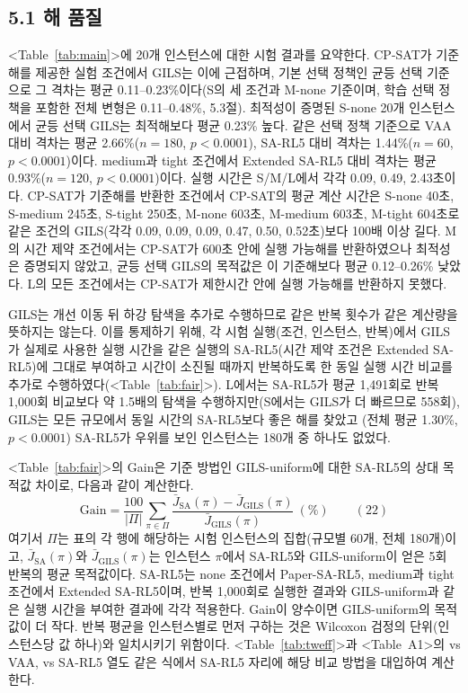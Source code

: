 \documentclass[10pt,a4paper]{article}
\begin{document}
\subsection{5.1 해 품질}
<Table~\ref{tab:main}>에 20개 인스턴스에 대한 시험 결과를 요약한다. CP-SAT가 기준해를 제공한
실험 조건에서 GILS는 이에 근접하며, 기본 선택 정책인 균등 선택 기준으로 그 격차는
평균 0.11--0.23\%이다(S의 세 조건과 M-none 기준이며, 학습 선택 정책을 포함한 전체 변형은 0.11--0.48\%, 5.3절). 최적성이 증명된 S-none 20개 인스턴스에서 균등 선택 GILS는 최적해보다 평균 0.23\% 높다. 같은 선택 정책 기준으로 VAA 대비
격차는 평균 2.66\%($n=180$, $p<0.0001$), SA-RL5 대비 격차는 1.44\%($n=60$, $p<0.0001$)이다.
medium과 tight 조건에서 Extended SA-RL5 대비 격차는 평균 0.93\%($n=120$, $p<0.0001$)이다. 실행 시간은 S/M/L에서 각각 0.09, 0.49, 2.43초이다.
CP-SAT가 기준해를 반환한 조건에서 CP-SAT의 평균 계산 시간은 S-none 40초, S-medium 245초, S-tight 250초, M-none 603초, M-medium 603초, M-tight 604초로 같은 조건의 GILS(각각 0.09, 0.09, 0.09, 0.47, 0.50, 0.52초)보다
100배 이상 길다. M의 시간 제약 조건에서는 CP-SAT가 600초 안에 실행 가능해를 반환하였으나 최적성은 증명되지 않았고, 균등 선택 GILS의 목적값은 이 기준해보다 평균 0.12--0.26\% 낮았다. L의 모든 조건에서는 CP-SAT가 제한시간 안에 실행 가능해를 반환하지 못했다.

GILS는 개선 이동 뒤 하강 탐색을 추가로 수행하므로 같은 반복 횟수가 같은 계산량을 뜻하지는 않는다. 이를 통제하기
위해, 각 시험 실행(조건, 인스턴스, 반복)에서 GILS가 실제로 사용한 실행 시간을 같은 실행의 SA-RL5(시간 제약 조건은
Extended SA-RL5)에 그대로 부여하고 시간이 소진될 때까지 반복하도록 한 동일 실행 시간 비교를 추가로
수행하였다(<Table~\ref{tab:fair}>). L에서는 SA-RL5가 평균 1{,}491회로 반복 1{,}000회 비교보다 약 1.5배의 탐색을
수행하지만(S에서는 GILS가 더 빠르므로 558회), GILS는 모든 규모에서 동일 시간의 SA-RL5보다 좋은 해를 찾았고
(전체 평균 1.30\%, $p<0.0001$) SA-RL5가 우위를 보인 인스턴스는 180개 중 하나도 없었다.

<Table~\ref{tab:fair}>의 Gain은 기준 방법인 GILS-uniform에 대한 SA-RL5의 상대 목적값 차이로, 다음과 같이 계산한다.
\[\mathrm{Gain}=\frac{100}{|\varPi|}\sum_{\pi\in\varPi}\frac{\bar J_{\mathrm{SA}}(\pi)-\bar J_{\mathrm{GILS}}(\pi)}{\bar J_{\mathrm{GILS}}(\pi)}\ (\%) \qquad (22)\]
여기서 $\varPi$는 표의 각 행에 해당하는 시험 인스턴스의 집합(규모별 60개, 전체 180개)이고, $\bar J_{\mathrm{SA}}(\pi)$와 $\bar J_{\mathrm{GILS}}(\pi)$는 인스턴스 $\pi$에서 SA-RL5와 GILS-uniform이 얻은 5회 반복의 평균 목적값이다. SA-RL5는 none 조건에서 Paper-SA-RL5, medium과 tight 조건에서 Extended SA-RL5이며, 반복 1{,}000회로 실행한 결과와 GILS-uniform과 같은 실행 시간을 부여한 결과에 각각 적용한다. Gain이 양수이면 GILS-uniform의 목적값이 더 작다. 반복 평균을 인스턴스별로 먼저 구하는 것은 Wilcoxon 검정의 단위(인스턴스당 값 하나)와 일치시키기 위함이다. <Table~\ref{tab:tweff}>과 <Table~A1>의 vs VAA, vs SA-RL5 열도 같은 식에서 SA-RL5 자리에 해당 비교 방법을 대입하여 계산한다.
\end{document}
